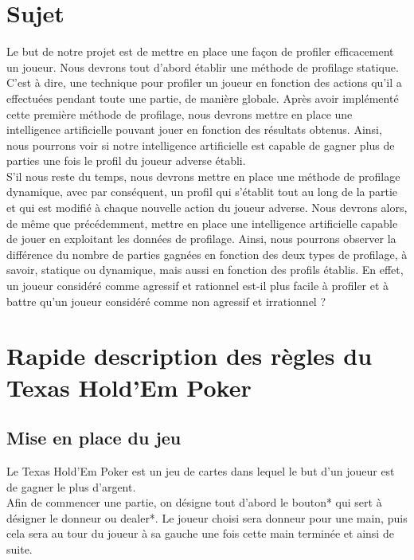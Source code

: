 \documentclass{report}
\begin{document}
\section{Sujet}
\hspace{0.5cm}Le but de notre projet est de mettre en place une façon de profiler efficacement un joueur. Nous devrons tout d'abord établir une méthode de profilage statique. C'est à dire, une technique pour profiler un joueur en fonction des actions qu'il a effectuées pendant toute une partie, de manière globale. Après avoir implémenté cette première méthode de profilage, nous devrons mettre en place une intelligence artificielle pouvant jouer en fonction des résultats obtenus. Ainsi, nous pourrons voir si notre intelligence artificielle est capable de gagner plus de parties une fois le profil du joueur adverse établi. \\

S'il nous reste du temps, nous devrons mettre en place une méthode de profilage dynamique, avec par conséquent, un profil qui s’établit tout au long de la partie et qui est modifié à chaque nouvelle action du joueur adverse. Nous devrons alors, de même que précédemment, mettre en place une intelligence artificielle capable de jouer en exploitant les données de profilage. Ainsi, nous pourrons observer la différence du nombre de parties gagnées en fonction des deux types de profilage, à savoir, statique ou dynamique, mais aussi en fonction des profils établis. En effet, un joueur considéré comme agressif et rationnel est-il plus facile à profiler et à battre qu'un joueur considéré comme non agressif et irrationnel ?\par

\section{Rapide description des règles du Texas Hold'Em Poker}
\subsection{Mise en place du jeu}
\hspace{0.5cm}Le Texas Hold'Em Poker est un jeu de cartes dans lequel le but d'un joueur est de gagner le plus d'argent. \\

Afin de commencer une partie, on désigne tout d'abord le bouton* qui sert à désigner le donneur ou dealer*. Le joueur choisi sera donneur pour une main, puis cela sera au tour du joueur à sa gauche une fois cette main terminée et ainsi de suite.  \\
\end{document}
